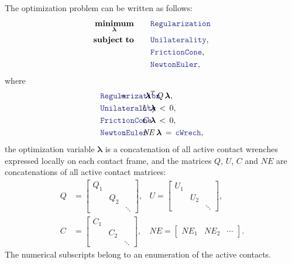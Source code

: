 \documentclass[12pt]{article}
\newcommand{\code}[2][Blue]{\textcolor{#1}{\texttt{#2}}}
\begin{document}
The optimization problem can be written as follows:
%
\begin{align}
    \underset{\bm{\lambda}}{\bm{\mathrm{minimum}}} &\qquad \code{Regularization}\\
    \bm{\mathrm{subject\;to}} &\qquad   \code{Unilaterality},      \nonumber\\
                  &\qquad  \code{FrictionCone},     \nonumber\\
                  & \qquad \code{NewtonEuler}, \nonumber
\end{align}
%
where 
%
\begin{align}
    &\code{Regularization}& &\hspace{-20mm}\!\!\!=  \qquad\bm{\lambda}^T \,Q \,\bm{\lambda}, \\
    &\code{Unilaterality}& &\hspace{-20mm}\code{:}\qquad U\,\bm{\lambda} \,<\, 0, \\
    &\code{FrictionCone}& &\hspace{-20mm}\code{:}\qquad C\,\bm{\lambda} \,<\, 0, \\
    &\code{NewtonEuler} & &\hspace{-20mm}\code{:}\qquad \mathit{NE} \,\bm{\lambda} \,=\, \code{cWrech},
\end{align}
%
the optimization variable $\bm{\lambda}$ is a concatenation of all active contact wrenches expressed locally on each contact frame, and the matrices $Q$, $U$, $C$ and $\mathit{NE}$ are concatenations of all active contact matrices:
%
\begin{align}
    Q & = \begin{bmatrix}
        Q_1 & & \\
         & Q_2 & \\
         & & \ddots
    \end{bmatrix}, & U = \begin{bmatrix}
        U_1 & & \\
         & U_2 & \\
         & & \ddots
    \end{bmatrix}, \\
    C & = \begin{bmatrix}
        C_1 & & \\
         & C_2 & \\
         & & \ddots
    \end{bmatrix}, & \mathit{NE} = \begin{bmatrix}
        \mathit{NE}_1 & \mathit{NE}_2 & \cdots 
    \end{bmatrix}.
\end{align}
%
The numerical subscripts belong to an enumeration of the active contacts.







\end{document}
